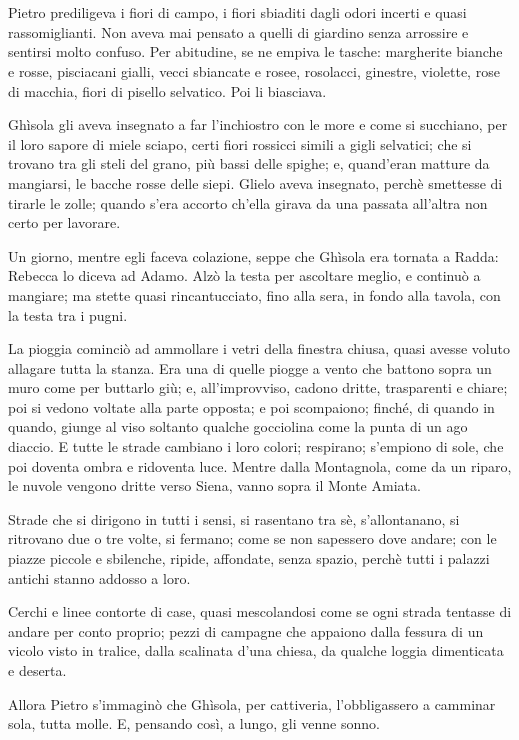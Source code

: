 \chapter{}

Pietro prediligeva i fiori di campo, i fiori sbiaditi dagli odori incerti e quasi rassomiglianti. Non aveva mai pensato a quelli di giardino senza arrossire e sentirsi molto confuso. Per abitudine, se ne empiva le tasche: margherite bianche e rosse, pisciacani gialli, vecci sbiancate e rosee, rosolacci, ginestre, violette, rose di macchia, fiori di pisello selvatico. Poi li biasciava.

Ghìsola gli aveva insegnato a far l'inchiostro con le more e come si succhiano, per il loro sapore di miele sciapo, certi fiori rossicci simili a gigli selvatici; che si trovano tra gli steli del grano, più bassi delle spighe; e, quand'eran matture da mangiarsi, le bacche rosse delle siepi. Glielo aveva insegnato, perchè smettesse di tirarle le zolle; quando s'era accorto ch'ella girava da una passata all'altra non certo per lavorare.

Un giorno, mentre egli faceva colazione, seppe che Ghìsola era tornata a Radda: Rebecca lo diceva ad Adamo. Alzò la testa per ascoltare meglio, e continuò a mangiare; ma stette quasi rincantucciato, fino alla sera, in fondo alla tavola, con la testa tra i pugni.

La pioggia cominciò ad ammollare i vetri della finestra chiusa, quasi avesse voluto allagare tutta la stanza. Era una di quelle piogge a vento che battono sopra un muro come per buttarlo giù; e, all'improvviso, cadono dritte, trasparenti e chiare; poi si vedono voltate alla parte opposta; e poi scompaiono; finché, di quando in quando, giunge al viso soltanto qualche gocciolina come la punta di un ago diaccio. E tutte le strade cambiano i loro colori; respirano; s'empiono di sole, che poi doventa ombra e ridoventa luce. Mentre dalla Montagnola, come da un riparo, le nuvole vengono dritte verso Siena, vanno sopra il Monte Amiata.

Strade che si dirigono in tutti i sensi, si rasentano tra sè, s'allontanano, si ritrovano due o tre volte, si fermano; come se non sapessero dove andare; con le piazze piccole e sbilenche, ripide, affondate, senza spazio, perchè tutti i palazzi antichi stanno addosso a loro.

Cerchi e linee contorte di case, quasi mescolandosi come se ogni strada tentasse di andare per conto proprio; pezzi di campagne che appaiono dalla fessura di un vicolo visto in tralice, dalla scalinata d'una chiesa, da qualche loggia dimenticata e deserta.

Allora Pietro s'immaginò che Ghìsola, per cattiveria, l'obbligassero a camminar sola, tutta molle. E, pensando così, a lungo, gli venne sonno.
